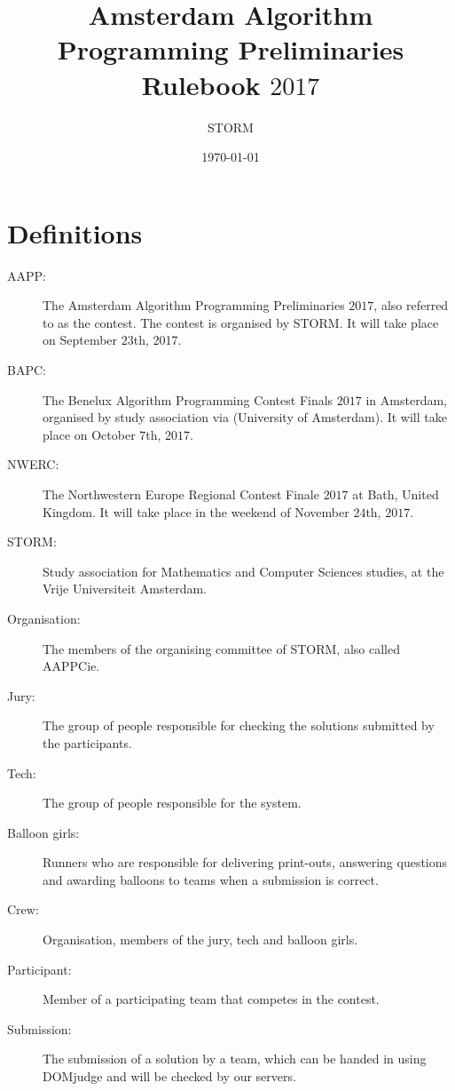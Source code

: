 \documentclass[11pt]{report}
\title{Amsterdam Algorithm Programming Preliminaries Rulebook $2017$}
\author{STORM}
\date{\today}
\begin{document}
\maketitle
\tableofcontents
\clearpage

\chapter{Definitions}
\begin{description}
\item[AAPP:]
The Amsterdam Algorithm Programming Preliminaries $2017$, also referred to as the contest. The contest is organised by STORM. It will take place on September $23$th, 2017.

\item[BAPC:]
The Benelux Algorithm Programming Contest Finals $2017$ in Amsterdam, organised by study association via (University of Amsterdam). It will take place on October $7$th, $2017$.

\item[NWERC:]
The Northwestern Europe Regional Contest Finale $2017$ at Bath, United Kingdom. It will take place in the weekend of November $24$th, $2017$.

\item[STORM:]
Study association for Mathematics and Computer Sciences studies, at the Vrije Universiteit Amsterdam.

\item[Organisation:]
The members of the organising committee of STORM, also called AAPPCie.


\item[Jury:]
The group of people responsible for checking the solutions submitted by the participants.

\item[Tech:]
The group of people responsible for the system.

\item[Balloon girls:]
Runners who are responsible for delivering print-outs, answering questions and awarding balloons to teams when a submission is correct.

\item[Crew:]
Organisation, members of the jury, tech and balloon girls. 

\item[Participant:]
Member of a participating team that competes in the contest. 

\item[Submission:]
The submission of a solution by a team, which can be handed in using DOMjudge and will be checked by our servers.
\end{description}
\end{document}
